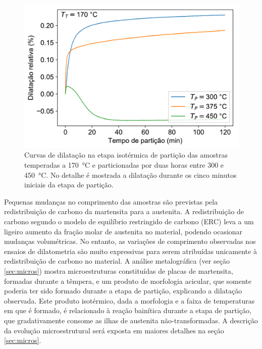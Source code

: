 \begin{figure}
  \includegraphics[width=.8\textwidth]{img/dilatometria/dlxt_QT=170-PT.pdf}
  \caption{Curvas de dilatação na etapa isotérmica de partição das amostras temperadas a \SI{170}{\degreeCelsius} e particionadas por duas horas entre 300 e \SI{450}{\degreeCelsius}. No detalhe é mostrada a dilatação durante os cinco minutos iniciais da etapa de partição.}
  \label{fig:QT170-PT2h}
\end{figure}

Pequenas mudanças no comprimento das amostras são previstas pela redistribuição de carbono da martensita para a austenita. A redistribuição de carbono segundo o modelo de equilíbrio restringido de carbono (ERC) leva a um ligeiro aumento da fração molar de austenita no material, podendo ocasionar mudanças volumétricas. No entanto, as variações de comprimento observadas nos ensaios de dilatometria são muito expressivas para serem atribuídas unicamente à redistribuição de carbono no material. A análise metalográfica (ver seção \ref{sec:micros}) mostra microestruturas constituídas de placas de martensita, formadas durante a têmpera, e um produto de morfologia acicular, que somente poderia ter sido formado durante a etapa de partição, explicando a dilatação observada. Este produto isotérmico, dada a morfologia e a faixa de temperaturas em que é formado, é relacionado à reação bainítica durante a etapa de partição, que gradativamente consome as ilhas de austenita não-transformadas. A descrição da evolução microestrutural será exposta em maiores detalhes na seção \ref{sec:micros}.

